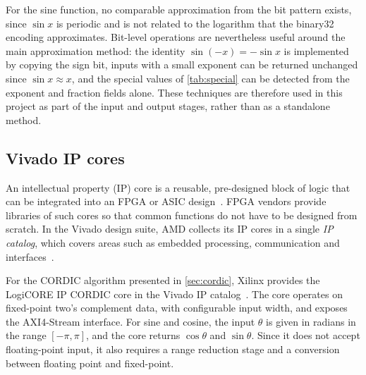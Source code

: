 For the sine function, no comparable approximation from the bit pattern exists, since $\sin x$ is periodic and is not related to the logarithm that the binary32 encoding approximates.
Bit-level operations are nevertheless useful around the main approximation method: the identity $\sin(-x) = -\sin x$ is implemented by copying the sign bit, inputs with a small exponent can be returned unchanged since $\sin x \approx x$, and the special values of \cref{tab:special} can be detected from the exponent and fraction fields alone.
These techniques are therefore used in this project as part of the input and output stages, rather than as a standalone method.

\subsection{Vivado IP cores}
\label{sec:vivado-ip}
An intellectual property (IP) core is a reusable, pre-designed block of logic that can be integrated into an FPGA or ASIC design~\cite{scs_lab04}. FPGA vendors provide libraries of such cores so that common functions do not have to be designed from scratch. In the Vivado design suite, AMD collects its IP cores in a single \emph{IP catalog}, which covers areas such as embedded processing, communication and interfaces~\cite{scs_lab04}.

For the CORDIC algorithm presented in \cref{sec:cordic}, Xilinx provides the LogiCORE IP CORDIC core in the Vivado IP catalog~\cite{cordic}.
The core operates on fixed-point two's complement data, with configurable input width, and exposes the AXI4-Stream interface.
For sine and cosine, the input $\theta$ is given in radians in the range $[-\pi, \pi]$, and the core returns $\cos\theta$ and $\sin\theta$.
Since it does not accept floating-point input, it also requires a range reduction stage and a conversion between floating point and fixed-point.